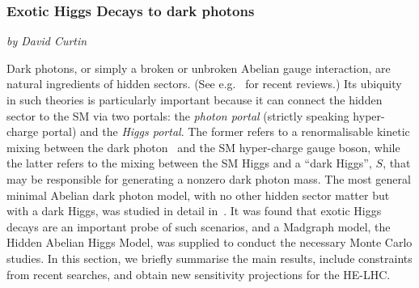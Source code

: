 \subsubsection{Exotic Higgs Decays to dark photons}\label{Sec:4lExo}

\begin{center}
    {\it{ by David Curtin}}
\end{center} 







Dark photons, or simply a broken or unbroken Abelian gauge interaction, are natural ingredients of hidden sectors. (See e.g.~\cite{Jaeckel:2010ni,Hewett:2012ns,Essig:2013lka,Alexander:2016aln,Battaglieri:2017aum} for recent reviews.) Its ubiquity in such theories is particularly important because it can connect the hidden sector to the SM via two portals: the \emph{photon portal} (strictly speaking hyper-charge portal) and the \emph{Higgs portal}. The former refers to a renormalisable kinetic mixing between the dark photon~\cite{Holdom:1985ag,Galison:1983pa,Dienes:1996zr} and the SM hyper-charge gauge boson, while the latter refers to the mixing between the SM Higgs and a ``dark Higgs'', $S$, that may be responsible for generating a nonzero dark photon mass. 
%
The most general minimal Abelian dark photon model, with no other hidden sector matter but with a dark Higgs, was studied in detail in~\cite{Curtin:2014cca}. It was found that exotic Higgs decays are an important probe of such scenarios, and a Madgraph \cite{Alwall:2011uj} model, the Hidden Abelian Higgs Model, was supplied to conduct the necessary Monte Carlo studies. In this section, we briefly summarise the main results, include constraints from recent searches, and obtain new sensitivity projections for the HE-LHC. 


